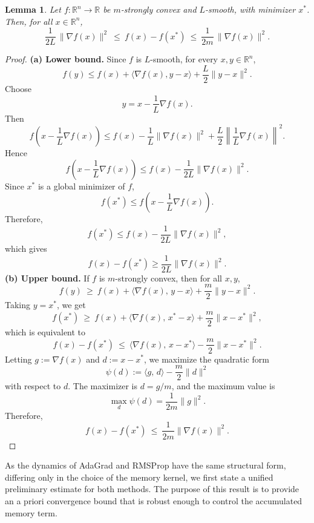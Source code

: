 \documentclass{article} %
\newtheorem{lemma}{Lemma}
\begin{document}
\begin{lemma}\label{lem:grad_bounds}
Let \( f : \mathbb{R}^n \to \mathbb{R} \) be \(m\)-strongly convex and \(L\)-smooth, with minimizer \(x^*\).  
Then, for all \( x \in \mathbb{R}^n \),
\[
    \frac{1}{2L} \, \|\nabla f(x)\|^2 
    \ \leq\ f(x) - f(x^*) 
    \ \leq\ \frac{1}{2m} \, \|\nabla f(x)\|^2.
\]
\end{lemma}

\begin{proof}
\noindent\textbf{(a) Lower bound.} Since \(f\) is \(L\)-smooth, for every \(x,y\in\mathbb R^n\),
\[
f(y)
\leq
f(x)+\langle \nabla f(x),y-x\rangle
+\frac L2\|y-x\|^2.
\]
Choose
\[
y=x-\frac1L\nabla f(x).
\]
Then
\[
f\left(x-\frac1L\nabla f(x)\right)
\leq
f(x)
-\frac1L\|\nabla f(x)\|^2
+\frac L2\left\|\frac1L\nabla f(x)\right\|^2.
\]
Hence
\[
f\left(x-\frac1L\nabla f(x)\right)
\leq
f(x)-\frac1{2L}\|\nabla f(x)\|^2.
\]
Since \(x^*\) is a global minimizer of \(f\),
\[
f(x^*)\leq f\left(x-\frac1L\nabla f(x)\right).
\]
Therefore,
\[
f(x^*)
\leq
f(x)-\frac1{2L}\|\nabla f(x)\|^2,
\]
which gives
\[
f(x)-f(x^*)
\geq
\frac1{2L}\|\nabla f(x)\|^2.
\]
\noindent\textbf{(b) Upper bound.}  
If \(f\) is \(m\)-strongly convex, then for all \(x,y\),
\[
    f(y) \ \geq\ f(x) + \langle \nabla f(x),\, y - x \rangle + \frac{m}{2} \|y - x\|^2.
\]
Taking \(y = x^*\), we get
\[
    f(x^*) \ \geq\ f(x) + \langle \nabla f(x),\, x^* - x \rangle + \frac{m}{2} \|x - x^*\|^2,
\]
which is equivalent to
\[
    f(x) - f(x^*) \ \leq\ \langle \nabla f(x),\, x - x^* \rangle - \frac{m}{2} \|x - x^*\|^2.
\]
Letting \(g := \nabla f(x)\) and \(d := x - x^*\), we maximize the quadratic form
\[
    \psi(d) := \langle g,\, d \rangle - \frac{m}{2} \|d\|^2
\]
with respect to \(d\). The maximizer is \(d = g/m\), and the maximum value is
\[
    \max_{d} \psi(d) = \frac{1}{2m} \|g\|^2.
\]
Therefore,
\[
    f(x) - f(x^*) \ \leq\ \frac{1}{2m} \|\nabla f(x)\|^2.
\]
\end{proof}

As the dynamics of AdaGrad and RMSProp have the same structural form, differing only in the choice of the memory kernel, we first state a unified preliminary estimate for both methods. The purpose of this result is to provide an a priori convergence bound that is robust enough to control the accumulated memory term.  
\end{document}
